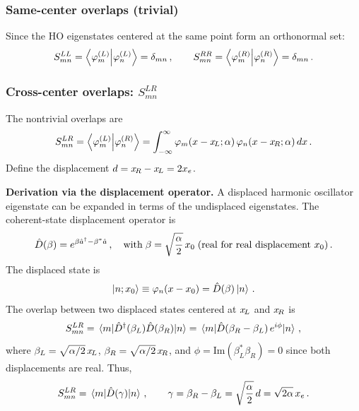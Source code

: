 \subsubsection{Same-center overlaps (trivial)}

Since the HO eigenstates centered at the same point form an orthonormal set:
\begin{equation}
  S_{mn}^{LL} = \braket{\varphi_m^{(L)}}{\varphi_n^{(L)}} = \delta_{mn}\,,\qquad
  S_{mn}^{RR} = \braket{\varphi_m^{(R)}}{\varphi_n^{(R)}} = \delta_{mn}\,.
\end{equation}

\subsubsection{Cross-center overlaps: $S_{mn}^{LR}$}

The nontrivial overlaps are
\begin{equation}
  S_{mn}^{LR} = \braket{\varphi_m^{(L)}}{\varphi_n^{(R)}}
  = \int_{-\infty}^{\infty}\varphi_m(x-x_{\!L};\alpha)\,\varphi_n(x-x_{\!R};\alpha)\,dx\,.
\end{equation}
Define the displacement $d = x_{\!R} - x_{\!L} = 2x_e$.

\textbf{Derivation via the displacement operator.}
A displaced harmonic oscillator eigenstate can be expanded in terms of the undisplaced eigenstates.
The coherent-state displacement operator is
\begin{equation}
  \hat{D}(\beta) = e^{\beta\hat{a}^{\dagger} - \beta^*\hat{a}}\,,\quad
  \text{with}\;\beta = \sqrt{\frac{\alpha}{2}}\,x_0\;\text{(real for real displacement $x_0$)}\,.
\end{equation}
The displaced state is
\begin{equation}
  \ket{n; x_0} \equiv \varphi_n(x - x_0) = \hat{D}(\beta)\ket{n}\,.
\end{equation}
The overlap between two displaced states centered at $x_{\!L}$ and $x_{\!R}$ is
\begin{equation}
  S_{mn}^{LR} = \mel{m}{\hat{D}^\dagger(\beta_L)\hat{D}(\beta_R)}{n}
  = \mel{m}{\hat{D}(\beta_R - \beta_L)\,e^{i\phi}}{n}\,,
\end{equation}
where $\beta_L = \sqrt{\alpha/2}\,x_{\!L}$, $\beta_R = \sqrt{\alpha/2}\,x_{\!R}$, and
$\phi = \text{Im}(\beta_L^*\beta_R) = 0$ since both displacements are real.
Thus,
\begin{equation}
  S_{mn}^{LR} = \mel{m}{\hat{D}(\gamma)}{n}\,,\qquad \gamma = \beta_R - \beta_L = \sqrt{\frac{\alpha}{2}}\,d = \sqrt{2\alpha}\,x_e\,.
\end{equation}


